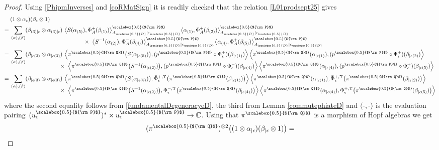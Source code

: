 \documentclass[11pt]{amsart}
\newcommand{\e}{\epsilon}
\newcommand{\eD}{\epsilon_{\scalebox{0.5}{D}}}
\newcommand{\Q}{{\scalebox{0.5}{${\rm Q}$}}}
\newcommand{\D}{{\scalebox{0.5}{D}}}
\newcommand{\Pup}{{\scalebox{0.5}{${\rm P}$}}}
\begin{document}
\begin{proof}
Using \eqref{PhipmInverses} and \eqref{coRMatSign} it is readily checked that the relation \eqref{L01prodsept25} gives 
\begin{align*}
&(1\otimes \alpha_\e)  ( \beta_\e\otimes 1) \\
=\:& \sum_{(\alpha),(\beta)} (\beta_{(3)|\e} \otimes \alpha_{(3)|\e})\ \bigl\langle S(\alpha_{(5)}),\Phi_A^+(\beta_{(1)})\bigr\rangle_{A_\D\vert \eD}^\Pup \bigl\langle \alpha_{(1)}, \Phi_A^+(\beta_{(2)})\bigr\rangle_{A_\D\vert \eD}^\Pup \\[-1em]
& \hspace*{4.5cm} \times\ \bigl\langle S^{-1}(\alpha_{(2)}), \Phi_A^-(\beta_{(4)})\bigr\rangle_{A_\D\vert \eD}^\Pup \bigl\langle \alpha_{(4)}, \Phi_A^+(\beta_{(5)})\bigr\rangle_{A_\D\vert \eD}^\Pup\\
=\:& \sum_{(\alpha),(\beta)}  (\beta_{|\e(3)} \otimes \alpha_{|\e(3)})\ \Bigl\langle \pi^\Q\bigl(S(\alpha_{|\e (5)})\bigr), (p^\Pup\circ \Phi_\e^+)(\beta_{|\e (1)}) \Bigr\rangle \, \Bigl\langle \pi^\Q(\alpha_{|\e (1)}),(p^\Pup\circ \Phi_\e^+)(\beta_{|\e (2)}) \Bigr\rangle\\[-1em]
& \hspace*{3cm} \times \ \Bigl\langle\pi^\Q\bigl(S^{-1}(\alpha_{|\e (2)})\bigr), (p^\Pup\circ \Phi_\e^-)(\beta_{|\e (4)}) \Bigr\rangle \, \Bigl\langle \pi^\Q(\alpha_{|\e (4)}), (p^\Pup\circ  \Phi_\e^+)(\beta_{|\e (5)}) \Bigr\rangle \\
=\:& \sum_{(\alpha),(\beta)}  (\beta_{|\e(3)} \otimes  \alpha_{|\e(3)})\ \Bigl\langle \pi^\Q\bigl(S(\alpha_{|\e (5)})\bigr), \bar{\Phi}_\e^{+,\Upsilon}\bigl(\pi^\Q(\beta_{|\e (1)})\bigr) \Bigr\rangle \, \Bigl\langle \pi^\Q(\alpha_{|\e (1)}), \bar{\Phi}_\e^{+,\Upsilon}\bigl(\pi^\Q(\beta_{|\e (2)}) \bigr) \Bigr\rangle \\[-1em]
 & \hspace*{3cm} \times \ \Bigl\langle \pi^\Q\bigr(S^{-1}(\alpha_{|\e (2)})\bigl), \bar{\Phi}_\e^{-,\Upsilon}\bigl(\pi^\Q(\beta_{|\e (4)})\bigr) \Bigr\rangle \, \Bigl\langle \pi^\Q(\alpha_{|\e (4)}), \bar{\Phi}_\e^{+,\Upsilon}\bigl(\pi^\Q(\beta_{|\e (5)})\bigr) \Bigr\rangle
\end{align*}
where the second equality follows from \eqref{fundamentalDegeneracyeD}, the third from Lemma \ref{commutephiateD} and $\langle \text{-},\text{-} \rangle$ is the evaluation pairing $(u_\e^\Pup)^* \times u_\e^\Pup \to \mathbb{C}$. Using that $\pi^\Q$ is a morphism of Hopf algebras we get
\begin{align*}
&(\pi^\Q)^{\otimes 2}\bigl((1\otimes \alpha_{|\e}) (\beta_{|\e}\otimes  1)\bigr) = \\

\end{align*}
\end{proof}
\end{document}
